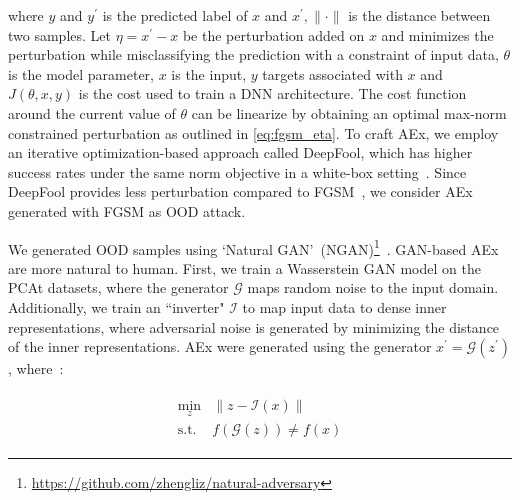 \hspace*{3.5mm} where $y$ and $y^{\prime}$ is the predicted label of $x$ and $x^{\prime},\|\cdot\|$ is the distance between two samples. Let $\eta=x^{\prime}-x$ be the perturbation added on $x$ and minimizes the perturbation while misclassifying the prediction with a constraint of input data, ${\theta}$ is the model parameter, ${x}$ is the input, $y$ targets associated with ${x}$ and $J( \theta, x,y)$ is the cost used to train a DNN architecture. The cost function around the current value of ${\theta}$ can be linearize by obtaining an optimal max-norm constrained perturbation as outlined in \cref{eq:fgsm_eta}. To craft AEx, we employ an iterative optimization-based approach called DeepFool, which has higher success rates under the same norm objective in a white-box setting~\cite{yuan2019adversarial}. Since DeepFool provides less perturbation compared to FGSM~\cite{yuan2019adversarial}, we consider AEx generated with FGSM as OOD attack. 

\iffalse
We generated OOD samples
using `Natural GAN'~(NGAN)\footnote{\url{https://github.com/zhengliz/natural-adversary}}~\cite{zhao2017generating}. 
GAN-based AEx are more natural to human. First, we train a Wasserstein GAN model on the PCAt datasets, where the generator $\mathcal{G}$ maps random noise to the input domain. Additionally, we train an ``inverter" $\mathcal{I}$ to map input data to dense inner representations, where adversarial noise is generated by minimizing the distance of the inner representations. AEx were generated using the generator $  x^{\prime}=\mathcal{G}\left(z^{\prime}\right)$, where~\cite{OOD19,zhao2017generating}: 

\vspace{-6mm}
\begin{align}
    \begin{array}{cl}
        \min _{z} & \|z-\mathcal{I}(x)\| \\
        \text {s.t.} & f(\mathcal{G}(z)) \neq f(x)
    \end{array}
\end{align}

